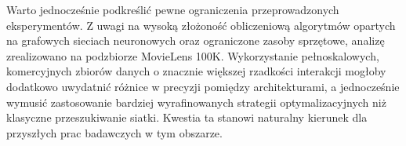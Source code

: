 Warto jednocześnie podkreślić pewne ograniczenia przeprowadzonych eksperymentów. Z uwagi na wysoką złożoność obliczeniową algorytmów opartych na grafowych sieciach neuronowych oraz ograniczone zasoby sprzętowe, analizę zrealizowano na podzbiorze MovieLens 100K. Wykorzystanie pełnoskalowych, komercyjnych zbiorów danych o znacznie większej rzadkości interakcji mogłoby dodatkowo uwydatnić różnice w precyzji pomiędzy architekturami, a jednocześnie wymusić zastosowanie bardziej wyrafinowanych strategii optymalizacyjnych niż klasyczne przeszukiwanie siatki. Kwestia ta stanowi naturalny kierunek dla przyszłych prac badawczych w tym obszarze.